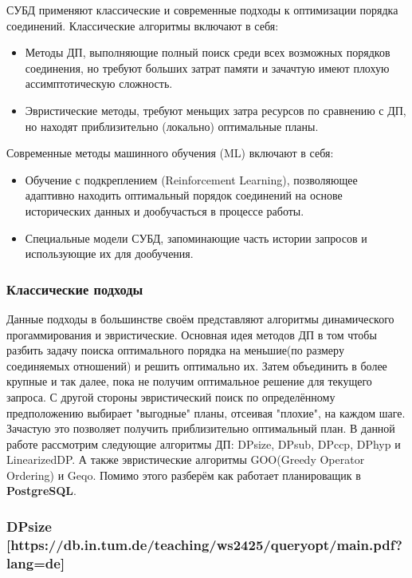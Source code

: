 \documentclass[12pt]{article}
\begin{document}
\begin{flushleft}
СУБД применяют классические и современные подходы к оптимизации 
порядка соединений.
\newline
Классические алгоритмы включают в себя:
\begin{itemize}
\item Методы ДП, выполняющие полный поиск среди всех возможных порядков
соединения, но требуют больших затрат памяти и зачачтую имеют плохую
ассимптотическую сложность.
\item Эвристические методы, требуют меньщих затра ресурсов по сравнению
с ДП, но находят приблизительно (локально) оптимальные планы.
\end{itemize}
Современные методы машинного обучения (ML) включают в себя:
\begin{itemize}
\item Обучение с подкреплением (Reinforcement Learning), позволяющее 
адаптивно находить оптимальный порядок соединений на основе исторических 
данных и дообучасться в процессе работы.
\item Специальные модели СУБД, запоминающие часть истории запросов и использующие их
для дообучения.
\end{itemize}

\centering \subsubsection*{Классические подходы}
\raggedright
Данные подходы в большинстве своём представляют алгоритмы динамического
прогаммирования и эвристические.
\newline
Основная идея методов ДП в том чтобы разбить задачу поиска оптимального
порядка на меньшие(по размеру соединяемых отношений) и решить оптимально их. Затем 
объединить в более крупные и так далее, пока не получим оптимальное решение 
для текущего запроса.
\newline
С другой стороны эвристический поиск по определённому предположению выбирает
"выгодные" планы, отсеивая "плохие", на каждом шаге. Зачастую это позволяет
получить приблизительно оптимальный план.
\newline
В данной работе рассмотрим следующие алгоритмы ДП: DPsize, DPsub, DPccp, 
DPhyp и LinearizedDP. А также эвристические алгоритмы GOO(Greedy Operator Ordering) и 
Geqo. Помимо этого разберём как работает планироващик в \textbf{PostgreSQL}.

\centering \subsubsection*{DPsize [https://db.in.tum.de/teaching/ws2425/queryopt/main.pdf?lang=de]} 
\raggedright


\end{flushleft}
\end{document}
